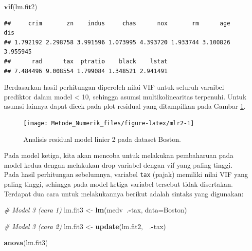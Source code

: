 \documentclass[]{book}
\newenvironment{Shaded}{\begin{snugshade}}{\end{snugshade}}
\newcommand{\CommentTok}[1]{\textcolor[rgb]{0.56,0.35,0.01}{\textit{#1}}}
\newcommand{\DataTypeTok}[1]{\textcolor[rgb]{0.13,0.29,0.53}{#1}}
\newcommand{\KeywordTok}[1]{\textcolor[rgb]{0.13,0.29,0.53}{\textbf{#1}}}
\newcommand{\NormalTok}[1]{#1}
\newcommand{\OperatorTok}[1]{\textcolor[rgb]{0.81,0.36,0.00}{\textbf{#1}}}
\newcommand{\StringTok}[1]{\textcolor[rgb]{0.31,0.60,0.02}{#1}}
\theoremstyle{definition}
\theoremstyle{definition}
\theoremstyle{definition}
\theoremstyle{remark}
\begin{document}
\begin{Shaded}
\begin{Highlighting}[]
\KeywordTok{vif}\NormalTok{(lm.fit2)}
\end{Highlighting}
\end{Shaded}

\begin{verbatim}
##     crim       zn    indus     chas      nox       rm      age      dis 
## 1.792192 2.298758 3.991596 1.073995 4.393720 1.933744 3.100826 3.955945 
##      rad      tax  ptratio    black    lstat 
## 7.484496 9.008554 1.799084 1.348521 2.941491
\end{verbatim}

Berdasarkan hasil perhitungan diperoleh nilai VIF untuk seluruh varaibel prediktor dalam model \textless{} 10, sehingga asumsi multikolinearitas terpenuhi. Untuk asumsi lainnya dapat dicek pada plot residual yang ditampilkan pada Gambar \ref{fig:mlr2}.

\begin{figure}

{\centering \texttt{[image: Metode\_Numerik\_files/figure-latex/mlr2-1]} 

}

\caption{Analisis residual model linier 2 pada dataset Boston.}\label{fig:mlr2}
\end{figure}

Pada model ketiga, kita akan mencoba untuk melakukan pembaharuan pada model kedua dengan melakukan drop variabel dengan vif yang paling tinggi. Pada hasil perhitungan sebelumnya, variabel \texttt{tax} (pajak) memiliki nilai VIF yang paling tinggi, sehingga pada model ketiga variabel tersebut tidak disertakan. Terdapat dua cara untuk melakukannya berikut adalah sintaks yang digunakan:

\begin{Shaded}
\begin{Highlighting}[]
\CommentTok{# Model 3 (cara 1)}
\NormalTok{lm.fit3 <-}\StringTok{ }\KeywordTok{lm}\NormalTok{(medv}\OperatorTok{~}\NormalTok{.}\OperatorTok{-}\NormalTok{tax, }\DataTypeTok{data=}\NormalTok{Boston)}

\CommentTok{# Model 3 (cara 2)}
\NormalTok{lm.fit3 <-}\StringTok{ }\KeywordTok{update}\NormalTok{(lm.fit2, }\OperatorTok{~}\NormalTok{.}\OperatorTok{-}\NormalTok{tax)}

\KeywordTok{anova}\NormalTok{(lm.fit3)}
\end{Highlighting}
\end{Shaded}
\end{document}
